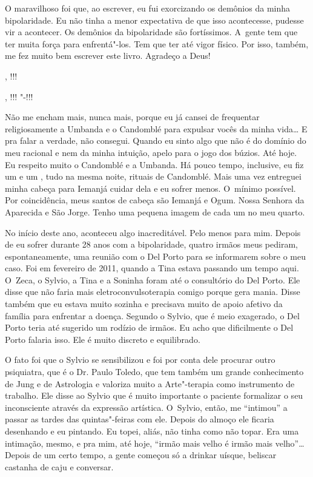O maravilhoso foi que, ao escrever, eu fui exorcizando os demônios da
minha bipolaridade. Eu não tinha a menor expectativa de que isso
acontecesse, pudesse vir a acontecer. Os demônios da bipolaridade são
fortíssimos. A~gente tem que ter muita força para enfrentá"-los. Tem que
ter até vigor físico. Por isso, também, me fez muito bem escrever este
livro. Agradeço a Deus!

, !!!

, !!! "-!!!

Não me encham mais, nunca mais, porque eu já cansei de frequentar
religiosamente a Umbanda e o Candomblé para expulsar vocês da minha
vida… E pra falar a verdade, não consegui. Quando eu sinto algo
que não é do domínio do meu racional e nem da minha intuição, apelo para
o jogo dos búzios. Até hoje. Eu respeito muito o Candomblé e a Umbanda.
Há pouco tempo, inclusive, eu fiz um  e um , tudo na mesma noite,
rituais de Candomblé. Mais uma vez entreguei minha cabeça para Iemanjá
cuidar dela e eu sofrer menos. O~mínimo possível. Por coincidência, meus
santos de cabeça são Iemanjá e Ogum. Nossa Senhora da Aparecida e São
Jorge. Tenho uma pequena imagem de cada um no meu quarto.

No início deste ano, aconteceu algo inacreditável. Pelo menos para mim.
Depois de eu sofrer durante 28 anos com a bipolaridade, quatro irmãos
meus pediram, espontaneamente, uma reunião com o Del Porto para se
informarem sobre o meu caso. Foi em fevereiro de 2011, quando a Tina
estava passando um tempo aqui. O~Zeca, o Sylvio, a Tina e a Soninha
foram até o consultório do Del Porto. Ele disse que não faria mais
eletroconvulsoterapia comigo porque gera mania. Disse também que eu
estava muito sozinha e precisava muito de apoio afetivo da família para
enfrentar a doença. Segundo o Sylvio, que é meio exagerado, o Del Porto
teria até sugerido um rodízio de irmãos. Eu acho que dificilmente o Del
Porto falaria isso. Ele é muito discreto e equilibrado.

O fato foi que o Sylvio se sensibilizou e foi por conta dele procurar
outro psiquiatra, que é o Dr. Paulo Toledo, que tem também um grande
conhecimento de Jung e de Astrologia e valoriza muito a Arte"-terapia
como instrumento de trabalho. Ele disse ao Sylvio que é muito importante
o paciente formalizar o seu inconsciente através da expressão artística.
O~Sylvio, então, me ``intimou'' a passar as tardes das quintas"-feiras
com ele. Depois do almoço ele ficaria desenhando e eu pintando. Eu
topei, aliás, não tinha como não topar. Era uma intimação, mesmo, e pra
mim, até hoje, ``irmão mais velho é irmão mais velho''… Depois de
um certo tempo, a gente começou só a drinkar uísque, beliscar castanha
de caju e conversar.


